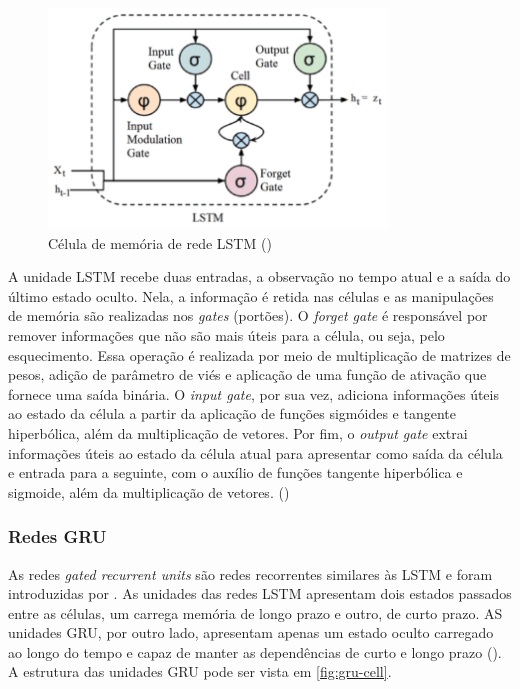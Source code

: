 \begin{figure}[H]
  \includegraphics[width=9cm]{../figuras/redes/lstm-cell.png}
  \caption{Célula de memória de rede LSTM (\cite{deeplearningbook})}
  \label{fig:lstm-cell}
\end{figure}

A unidade LSTM recebe duas entradas, a observação no tempo atual e a saída do 
último estado oculto. Nela, a informação é retida nas células e as manipulações de memória 
são realizadas nos \textit{gates} (portões). O \textit{forget gate} é responsável
por remover informações que não são mais úteis para a célula, ou seja, pelo 
esquecimento. Essa operação é realizada por meio de multiplicação de matrizes 
de pesos, adição de parâmetro de viés e aplicação de uma função de ativação que fornece uma saída binária. 
O \textit{input gate}, por sua vez, adiciona informações úteis ao estado da célula
a partir da aplicação de funções sigmóides e tangente hiperbólica, além da multiplicação de vetores. 
Por fim, o \textit{output gate} extrai informações úteis ao estado da célula atual 
para apresentar como saída da célula e entrada para a seguinte, com o auxílio de funções tangente
hiperbólica e sigmoide, além da multiplicação de vetores. (\cite{deeplearningbook})

\subsubsection{Redes GRU}


As redes \textit{gated recurrent units} são redes recorrentes
similares às LSTM e foram introduzidas por \cite{gru}.
As unidades
das redes LSTM apresentam dois estados passados entre as células,
um carrega memória de longo prazo e outro, de curto prazo. AS unidades 
GRU, por outro lado, apresentam apenas um 
estado oculto carregado ao longo do tempo e capaz de manter
as dependências de curto e longo prazo (\cite{deeplearningbook}). A 
estrutura das unidades GRU pode ser vista em \ref{fig:gru-cell}.


